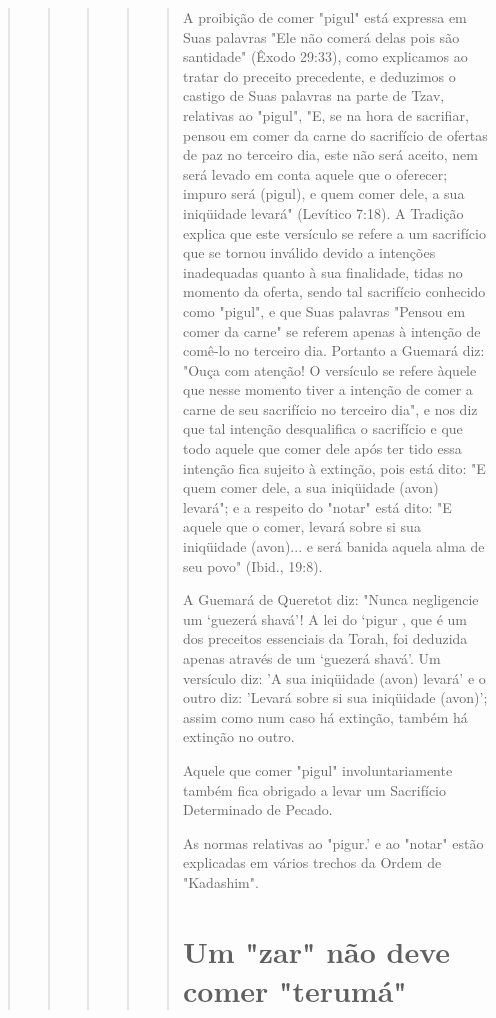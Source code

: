 \begin{quote}
\begin{quote}
\begin{quote}
\begin{quote}
\begin{quote}
A proibição de comer "pigul" está expressa em Suas palavras "Ele não
comerá delas pois são santidade" (Êxodo 29:33), como explicamos ao
tra­tar do preceito precedente, e deduzimos o castigo de Suas palavras
na parte de Tzav, relativas ao "pigul", "E, se na hora de sacrifiar,
pensou em comer da carne do sacrifício de ofertas de paz no terceiro
dia, este não será aceito, nem será levado em conta aquele que o
oferecer; impuro será (pigul), e quem comer dele, a sua iniqüidade
levará" (Levítico 7:18). A Tradição explica que este versículo se refere
a um sacrifício que se tornou inválido devido a intenções
inadequadas quanto à sua finalidade, tidas no momento da oferta, sendo
tal sa­crifício conhecido como "pigul", e que Suas palavras "Pensou em
comer da carne" se referem apenas à intenção de comê-lo no terceiro dia.
Portanto a Gue­mará diz: "Ouça com atenção! O versículo se refere àquele
que nesse momen­to tiver a intenção de comer a carne de seu sacrifício
no terceiro dia", e nos diz que tal intenção desqualifica o sacrifício e
que todo aquele que comer dele após ter tido essa intenção fica sujeito
à extinção, pois está dito: "E quem co­mer dele, a sua iniqüidade (avon)
levará"; e a respeito do "notar" está dito: "E aquele que o comer,
levará sobre si sua iniqüidade (avon)... e será banida aquela alma de
seu povo" (Ibid., 19:8).

A Guemará de Queretot diz: "Nunca negligencie um `guezerá sha­vá'! A lei
do `pigur , que é um dos preceitos essenciais da Torah, foi deduzida
apenas através de um `guezerá shavá'. Um versículo diz: 'A sua
iniqüidade (avon) levará' e o outro diz: 'Levará sobre si sua iniqüidade
(avon)'; assim como num caso há extinção, também há extinção no outro.

Aquele que comer "pigul" involuntariamente também fica obriga­do a levar
um Sacrifício Determinado de Pecado.

As normas relativas ao "pigur.' e ao "notar" estão explicadas em vá­rios
trechos da Ordem de "Kadashim".

\section{Um "zar" não deve comer "terumá"}
\end{quote}


\end{quote}
\end{quote}
\end{quote}
\end{quote}
